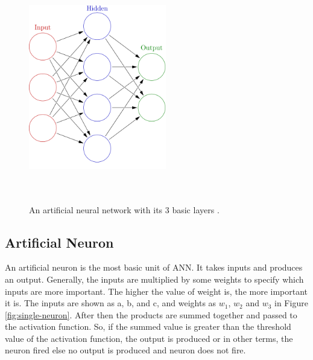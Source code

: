 \begin{figure}[htpb]
	\centering
	\includegraphics[width=6cm,height=10cm,keepaspectratio=true]{images/neural-net}
	\caption{
		An artificial neural network with its 3 basic layers \cite{wiki:ann}.
	}
	\label{fig:wiki:ann}
\end{figure}


\subsection{Artificial Neuron}
An artificial neuron is the most basic unit of ANN. It takes inputs and produces an output. Generally, the inputs are multiplied by some weights to specify which inputs are more important. The higher the value of weight is, the more important it is. The inputs are shown as a, b, and c, and weights as $w_1$, $w_2$ and $w_3$ in Figure \ref{fig:single-neuron}. After then the products are summed together and passed to the activation function. So, if the summed value is greater than the threshold value of the activation function, the output is produced or in other terms, the neuron fired else no output is produced and neuron does not fire.

